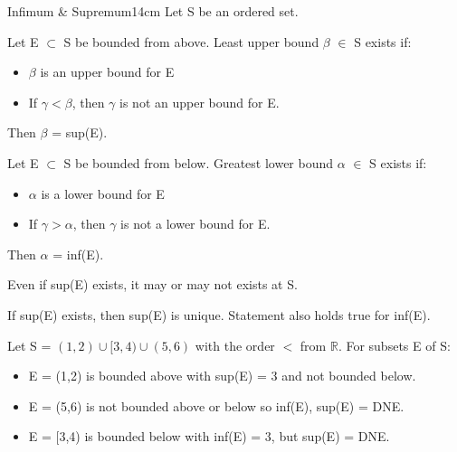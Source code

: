 	\begin{definition}{Infimum \& Supremum}{14cm}
		Let S be an ordered set.

		Let E $ \subset $ S be bounded from above.
		Least upper bound $\beta$ $\in$ S exists if:
		
		\begin{itemize}[leftmargin=1.5cm, itemsep=0.1cm]
			\item $\beta$ is an upper bound for E
		
			\item If $\gamma < \beta$, then $ \gamma $ is not an upper bound for E.
		\end{itemize}

		Then $\beta$ = sup(E).

		\vspace{0.3cm}

		Let E $\subset$ S be bounded from below.
		Greatest lower bound $\alpha$ $\in$ S exists if:
		
		\begin{itemize}[leftmargin=1.5cm , itemsep=0.1cm]
			\item $\alpha$ is a lower bound for E

			\item If $\gamma > \alpha$, then $\gamma$ is not a lower bound for E.
		\end{itemize}

		Then $\alpha$ = inf(E).

		\vspace{0.3cm}

		Even if sup(E) exists, it may or may not exists at S.

		If sup(E) exists, then sup(E) is unique.
		Statement also holds true for inf(E).
	\end{definition}
	
	\vspace{0.5cm}



	\begin{example}
		Let S = $ (1,2) \cup [3,4) \cup (5,6) $ with the
		order $ < $ from $ \mathbb{R} $. For subsets E of S:

		\begin{itemize}[leftmargin=1.5cm, itemsep=0.1cm]
			\item E = (1,2) is bounded above with sup(E) = 3 and not bounded below.
		
			\item E = (5,6) is not bounded above or below so inf(E), sup(E) = DNE.
		
			\item E = [3,4) is bounded below with inf(E) = 3, but sup(E) = DNE. \\
		\end{itemize}	
	\end{example}

